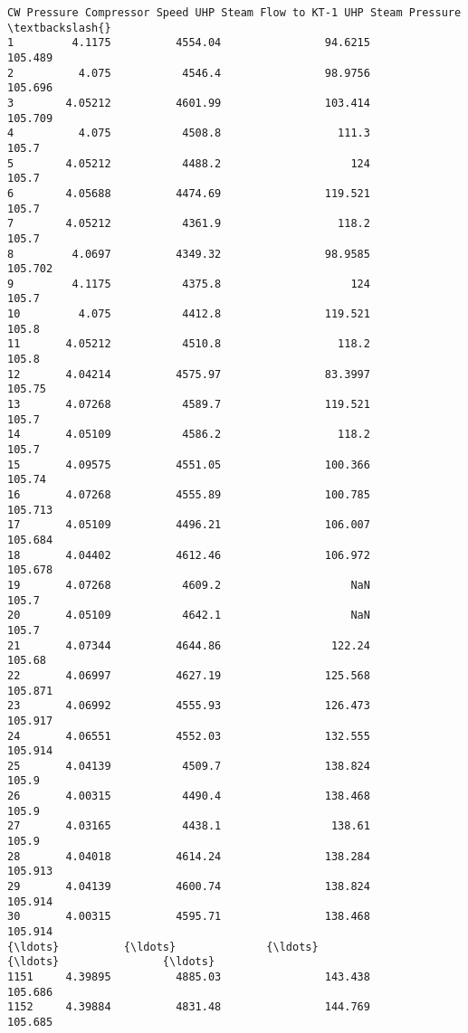\documentclass[11pt]{article}
\begin{document}
\begin{tcolorbox}[breakable, size=fbox, boxrule=.5pt, pad at break*=1mm, opacityfill=0]
\begin{Verbatim}[commandchars=\\\{\}]
     CW Pressure Compressor Speed UHP Steam Flow to KT-1 UHP Steam Pressure  \textbackslash{}
1         4.1175          4554.04                94.6215            105.489
2          4.075           4546.4                98.9756            105.696
3        4.05212          4601.99                103.414            105.709
4          4.075           4508.8                  111.3              105.7
5        4.05212           4488.2                    124              105.7
6        4.05688          4474.69                119.521              105.7
7        4.05212           4361.9                  118.2              105.7
8         4.0697          4349.32                98.9585            105.702
9         4.1175           4375.8                    124              105.7
10         4.075           4412.8                119.521              105.8
11       4.05212           4510.8                  118.2              105.8
12       4.04214          4575.97                83.3997             105.75
13       4.07268           4589.7                119.521              105.7
14       4.05109           4586.2                  118.2              105.7
15       4.09575          4551.05                100.366             105.74
16       4.07268          4555.89                100.785            105.713
17       4.05109          4496.21                106.007            105.684
18       4.04402          4612.46                106.972            105.678
19       4.07268           4609.2                    NaN              105.7
20       4.05109           4642.1                    NaN              105.7
21       4.07344          4644.86                 122.24             105.68
22       4.06997          4627.19                125.568            105.871
23       4.06992          4555.93                126.473            105.917
24       4.06551          4552.03                132.555            105.914
25       4.04139           4509.7                138.824              105.9
26       4.00315           4490.4                138.468              105.9
27       4.03165           4438.1                 138.61              105.9
28       4.04018          4614.24                138.284            105.913
29       4.04139          4600.74                138.824            105.914
30       4.00315          4595.71                138.468            105.914
{\ldots}          {\ldots}              {\ldots}                    {\ldots}                {\ldots}
1151     4.39895          4885.03                143.438            105.686
1152     4.39884          4831.48                144.769            105.685

\end{Verbatim}
\end{tcolorbox}
\end{document}
